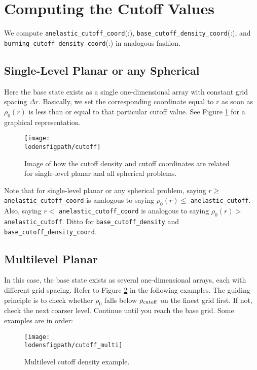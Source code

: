 \section{Computing the Cutoff Values}
We compute {\tt anelastic\_cutoff\_coord}(:), {\tt base\_cutoff\_density\_coord}(:), 
and {\tt burning\_cutoff\_density\_coord}(:) in analogous fashion.

\subsection{Single-Level Planar or any Spherical}
Here the base state exists as a single one-dimensional array with constant grid
spacing $\Delta r$.  Basically, we set the corresponding coordinate equal to $r$ as soon 
as $\rho_0(r)$ is less than  or equal to that particular cutoff value.
See Figure \ref{Fig:Cutoff} for a graphical representation.
\begin{figure}[hpb]
\centering
\texttt{[image: \\lodensfigpath/cutoff]}\hspace{0.2in}
\caption[Cutoff density and coordinates]{Image of how the cutoff density and cutoff coordinates
are related for single-level planar and all spherical problems.}
\label{Fig:Cutoff}
\end{figure}

Note that for single-level planar or any spherical problem, saying $r\ge$ {\tt anelastic\_cutoff\_coord} is analogous to saying $\rho_0(r)\le$ {\tt anelastic\_cutoff}.  Also, saying $r<$ {\tt anelastic\_cutoff\_coord} is analogous to saying $\rho_0(r)>$ {\tt anelastic\_cutoff}.  Ditto for {\tt base\_cutoff\_density} and {\tt base\_cutoff\_density\_coord}.

\subsection{Multilevel Planar}
In this case, the base state exists as several one-dimensional arrays, each with
different grid spacing.  Refer to Figure \ref{Fig:Cutoff_Multi} in the following examples.
The guiding principle is to check whether $\rho_0$ falls below $\rho_{\rm cutoff}$ on the finest
grid first.  If not, check the next coarser level.  Continue until you reach the base grid.
Some examples are in order:
\begin{figure}[hpb]
\centering
\texttt{[image: \\lodensfigpath/cutoff\_multi]}\hspace{0.2in}
\caption{Multilevel cutoff density example.}
\label{Fig:Cutoff_Multi}
\end{figure}

